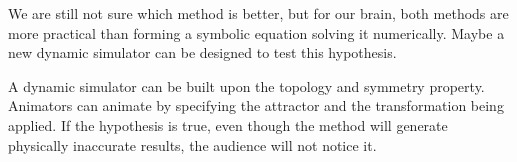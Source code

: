 We are still not sure which method is better, but for our brain, both methods are more practical than forming a symbolic equation solving it numerically.
Maybe a new dynamic simulator can be designed to test this hypothesis.

A dynamic simulator can be built upon the topology and symmetry property.
Animators can animate by specifying the attractor and the transformation being  applied.
If the hypothesis is true, even though the method will generate physically inaccurate results, the audience will not notice it.








